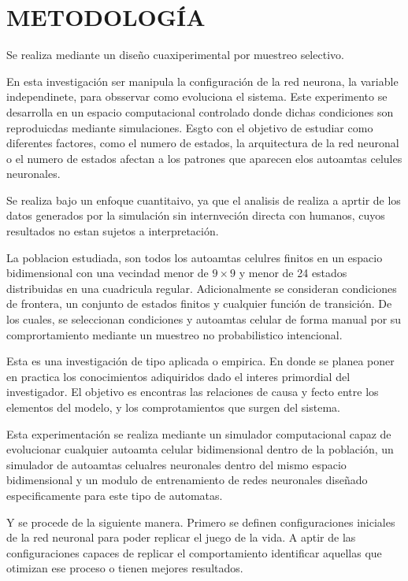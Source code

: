 \section{METODOLOGÍA}

Se realiza mediante un diseño cuaxiperimental por muestreo selectivo.

En esta investigación ser manipula la configuración de la red neurona, la variable independinete, para obsservar como evoluciona el sistema. Este experimento se desarrolla en un espacio computacional controlado donde dichas condiciones son reproduicdas mediante simulaciones. Esgto con el objetivo de estudiar como diferentes factores, como el numero de estados, la arquitectura de la red neuronal o el numero de estados afectan a los patrones que aparecen elos autoamtas celules neuronales. 

Se realiza bajo un enfoque cuantitaivo, ya que el analisis de realiza a aprtir de los datos generados por la simulación sin internveción directa con humanos, cuyos resultados no estan sujetos a interpretación. 

La poblacion estudiada, son todos los autoamtas celulres finitos en un espacio bidimensional con una vecindad menor de $9 \times 9$ y menor de 24 estados distribuidas en una cuadricula regular. Adicionalmente se consideran condiciones de frontera, un conjunto de estados finitos y cualquier función de transición. De los cuales, se seleccionan condiciones y autoamtas celular de forma manual por su comprortamiento mediante un muestreo no probabilistico intencional.

Esta es una investigación de tipo aplicada o empirica. En donde se planea poner en practica los conocimientos adiquiridos dado el interes primordial del investigador. El objetivo es encontras las relaciones de causa y fecto entre los elementos del modelo, y los comprotamientos que surgen del sistema. 

Esta experimentación se realiza mediante un simulador computacional capaz de evolucionar cualquier autoamta celular bidimensional dentro de la población, un simulador de autoamtas celualres neuronales dentro del mismo espacio bidimensional y un modulo de entrenamiento de redes neuronales diseñado especificamente para este tipo de automatas.

Y se procede de la siguiente manera. Primero se definen configuraciones iniciales de la red neuronal para poder replicar el juego de la vida. A aptir de las configuraciones capaces de replicar el comportamiento identificar aquellas que otimizan ese proceso o tienen mejores resultados. 

